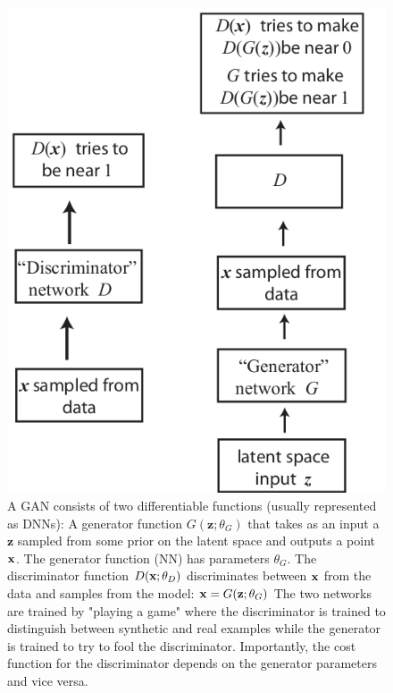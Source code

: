 \begin{figure}[h!]
	\centering
	\includegraphics[width=0.7\linewidth]{gfx/GAN}
	\caption{ A GAN consists of two differentiable functions (usually represented as DNNs): A generator function $G(\mathbf{z};\theta_G)$ that takes as an input a $\mathbf{z}$ sampled from some prior on the latent space and outputs a point $\mathbf{x}$. The generator function (NN) has parameters $\theta_G$. The discriminator function $D(\mathbf{x};\theta_D)$ discriminates between $\mathbf{x}$ from the data and samples from the model: $\mathbf{x} = G(\mathbf{z};\theta_G)$ The two networks are trained by "playing a game" where the discriminator is trained to distinguish between synthetic and real examples while the generator is trained to try to fool the discriminator. Importantly, the cost function for the discriminator depends on the generator parameters and vice versa.}
	\label{fig:gan}
\end{figure}




















